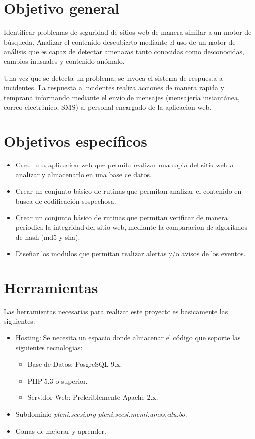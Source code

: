 \documentclass[letter,twoside,11pt]{article}
\begin{document}
\section{Objetivo general}
Identificar problemas de seguridad de sitios web de manera similar a un motor de
búsqueda. Analizar el contenido descubierto mediante el uso de un motor de
análisis que es capaz de detectar amenazas tanto conocidas como desconocidas,
cambios inusuales y contenido anómalo.

Una vez que se detecta un problema, se invoca el sistema de respuesta a
incidentes. La respuesta a incidentes realiza acciones de manera rapida y
temprana informando mediante el envío de mensajes (mensajería instantánea,
correo electrónico, SMS) al personal encargado de la aplicacion web.

\section{Objetivos específicos}
\begin{itemize}
\item Crear una aplicacion web que permita realizar una copia del sitio web a
    analizar y almacenarlo en una base de datos.
\item Crear un conjunto básico de rutinas que permitan analizar el contenido en
    busca de codificación sospechosa.
\item Crear un conjunto básico de rutinas que permitan verificar de manera
    periodica la integridad del sitio web, mediante la comparacion de algoritmos
    de hash (md5 y sha).
\item Diseñar los modulos que permitan realizar alertas y/o avisos de los
    eventos.
\end{itemize}

\section{Herramientas}
Las herramientas necesarias para realizar este proyecto es basicamente las
siguientes:

\begin{itemize}
\item Hosting: Se necesita un espacio donde almacenar el código que soporte las
    siguientes tecnologias:
    \begin{itemize}
    \item Base de Datos: PosgreSQL 9.x.
    \item PHP 5.3 o superior.
    \item Servidor Web: Preferiblemente Apache 2.x.
    \end{itemize}
\item Subdominio \textit{pleni.scesi.org}-\textit{pleni.scesi.memi.umss.edu.bo}.
\item Ganas de mejorar y aprender.
\end{itemize}
\end{document}
